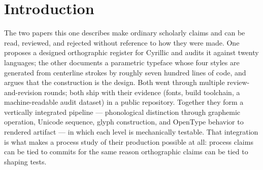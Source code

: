 \documentclass[11pt]{article}
\begin{document}
\begin{abstract}
A postscript analyzes a second round two days later, in which the same critic carried the shipped binaries into a design-native harness of the same model family. The second builder began by auditing the artifact rather than the source, applied the transmitted rules unprompted, and met independent recurrences of the same failure classes — evidence consistent with the rules being properties of the task rather than idiosyncrasies of a builder.

The paper's central observation is that the criticism changed the builder's operative \emph{method}, not merely its outputs: from patching to preserving relationships, from trusting compilation to testing behavior, from deriving conventions to measuring exemplars, from local repairs to reusable checks. We position the episode against the automation literature, which evaluates language models writing papers without human taste in the loop, and offer the opposite corner — dense, cheap, artifact-level human judgment steering machine construction — as a documented case worth instrumenting, not as a demonstrated superior workflow. The paper closes with the authorship accounting current editorial policy requires — made reflexively awkward, and therefore explicit, by the fact that the model wrote this sentence.
\end{abstract}

\section{Introduction}

The two papers this one describes make ordinary scholarly claims and can be read, reviewed, and rejected without reference to how they were made. One proposes a designed orthographic register for Cyrillic and audits it against twenty languages; the other documents a parametric typeface whose four styles are generated from centerline strokes by roughly seven hundred lines of code, and argues that the construction is the design. Both went through multiple review-and-revision rounds; both ship with their evidence (fonts, build toolchain, a machine-readable audit dataset) in a public repository. Together they form a vertically integrated pipeline — phonological distinction through graphemic operation, Unicode sequence, glyph construction, and OpenType behavior to rendered artifact — in which each level is mechanically testable. That integration is what makes a process study of their production possible at all: process claims can be tied to commits for the same reason orthographic claims can be tied to shaping tests.
\end{document}
